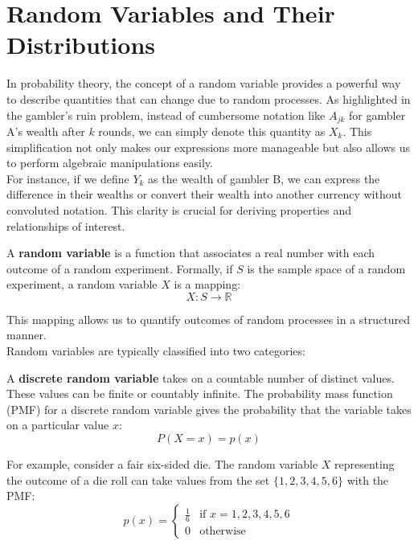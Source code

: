 \section{Random Variables and Their Distributions}

In probability theory, the concept of a random variable provides a powerful way to describe quantities that can change due to random processes. As highlighted in the gambler’s ruin problem, instead of cumbersome notation like \( A_{jk} \) for gambler A's wealth after \( k \) rounds, we can simply denote this quantity as \( X_k \). This simplification not only makes our expressions more manageable but also allows us to perform algebraic manipulations easily.\\

For instance, if we define \( Y_k \) as the wealth of gambler B, we can express the difference in their wealths or convert their wealth into another currency without convoluted notation. This clarity is crucial for deriving properties and relationships of interest.\\

\begin{definition}
    A \textbf{random variable} is a function that associates a real number with each outcome of a random experiment. Formally, if \( S \) is the sample space of a random experiment, a random variable \( X \) is a mapping:
\[
X: S \rightarrow \mathbb{R}
\]
\end{definition}

This mapping allows us to quantify outcomes of random processes in a structured manner.\\

Random variables are typically classified into two categories:

\begin{definition}
    A \textbf{discrete random variable} takes on a countable number of distinct values. These values can be finite or countably infinite. The probability mass function (PMF) for a discrete random variable gives the probability that the variable takes on a particular value \( x \):
\[
P(X = x) = p(x)
\]
\end{definition}

For example, consider a fair six-sided die. The random variable \( X \) representing the outcome of a die roll can take values from the set \( \{1, 2, 3, 4, 5, 6\} \) with the PMF:
\[
p(x) = 
\begin{cases} 
\frac{1}{6} & \text{if } x = 1, 2, 3, 4, 5, 6 \\
0 & \text{otherwise}
\end{cases}
\]

